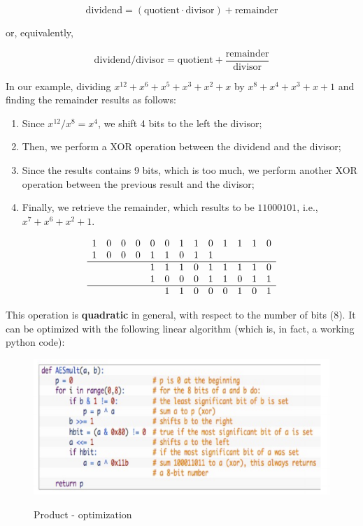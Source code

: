 $$
\text{dividend} = (\text{quotient} \cdot \text{divisor}) + \text{remainder}
$$

or, equivalently,

$$
\text{dividend} / \text{divisor} = \text{quotient} + \frac{\text{remainder}}{\text{divisor}} 
$$

In our example, dividing $x^{12}+x^6+x^5+x^3+x^2+x$ by $x^8 + x^4 + x^3 + x + 1$ and finding the remainder results as follows:

\begin{enumerate}
    \item Since $x^{12}/x^8 = x^4$, we shift 4 bits to the left the divisor;
    \item Then, we perform a XOR operation between the dividend and the divisor;
    \item Since the results contains 9 bits, which is too much, we perform another XOR operation between the previous result and the divisor;
    \item Finally, we retrieve the remainder, which results to be $11000101$, i.e., $x^7 + x^6 + x^2 + 1$.
\end{enumerate}

$$
\begin{array}{ccccccccccccc}1&0&0&0&0&0&1&1&0&1&1&1&0 \\ 1&0&0&0&1&1&0&1&1 \\\hline & & & &1&1&1&0&1&1&1&1&0\\ & & & &1&0&0&0&1&1&0&1&1 \\\hline & & & & &1&1&0&0&0&1&0&1 \end{array}
$$

This operation is \textbf{quadratic} in general, with respect to the number of bits (8). It can be optimized with the following linear algorithm (which is, in fact, a working python code):

\begin{figure}[h!]
        \centering
        \includegraphics[scale = 0.8]{img/aes1.png}
        \label{aes1}
        \caption{Product - optimization}
\end{figure}

